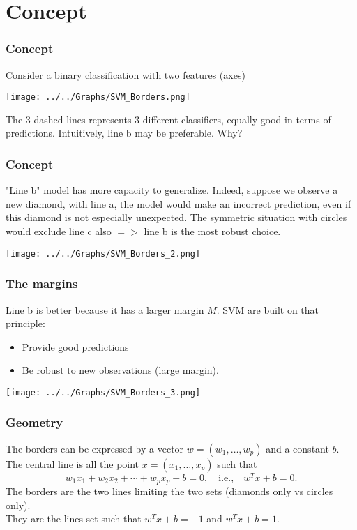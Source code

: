 \section{Concept}
\begin{frame}
\frametitle{Concept}
Consider a binary classification with two features (axes) 
\begin{center}
\texttt{[image: ../../Graphs/SVM\_Borders.png]} 
\end{center}
The 3 dashed lines represents 3 different classifiers, equally good in terms of predictions. Intuitively, line b may be preferable. Why?
\end{frame}
\begin{frame}
\frametitle{Concept}
"Line b" model has more capacity to generalize. Indeed, suppose we observe a new diamond, with line a, the model would make an incorrect prediction, even if this diamond is not especially unexpected. The symmetric situation with circles would exclude line c also $=>$ line b is the most robust choice.
\begin{center}
\texttt{[image: ../../Graphs/SVM\_Borders\_2.png]} 
\end{center}
\end{frame}
\begin{frame}
\frametitle{The margins}
Line b is better because it has a larger margin $M$. SVM are built on that principle: 
\begin{itemize}
\item Provide good predictions 
\item Be robust to new observations (large margin).
\end{itemize}
\begin{center}
\texttt{[image: ../../Graphs/SVM\_Borders\_3.png]} 
\end{center}
\end{frame}
\begin{frame}
\frametitle{Geometry}
The borders can be expressed by a vector $w=(w_1,\ldots,w_p)$ and a constant $b$. The central line is all the point $x=(x_1,\ldots,x_p)$ such that
$$
w_1x_1 + w_2x_2 + \cdots + w_p x_p + b = 0, \quad \mbox{i.e.,} \quad w^T x + b = 0.
$$
The borders are the two lines limiting the two sets (diamonds only vs circles only). \\
\vspace{0.2cm}
They are the lines set such that $w^T x + b = -1$ and $w^T x + b = 1$. 
\end{frame}
